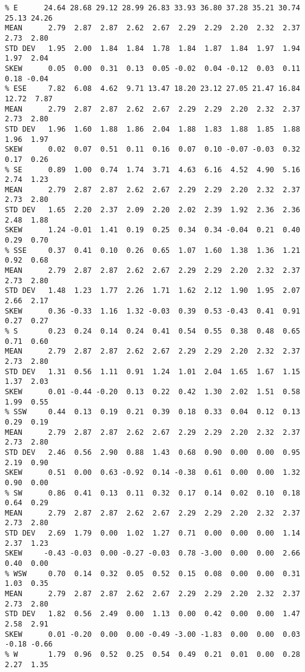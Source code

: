 \begin{verbatim}
% E      24.64 28.68 29.12 28.99 26.83 33.93 36.80 37.28 35.21 30.74 25.13 24.26
MEAN      2.79  2.87  2.87  2.62  2.67  2.29  2.29  2.20  2.32  2.37  2.73  2.80
STD DEV   1.95  2.00  1.84  1.84  1.78  1.84  1.87  1.84  1.97  1.94  1.97  2.04
SKEW      0.05  0.00  0.31  0.13  0.05 -0.02  0.04 -0.12  0.03  0.11  0.18 -0.04
% ESE     7.82  6.08  4.62  9.71 13.47 18.20 23.12 27.05 21.47 16.84 12.72  7.87
MEAN      2.79  2.87  2.87  2.62  2.67  2.29  2.29  2.20  2.32  2.37  2.73  2.80
STD DEV   1.96  1.60  1.88  1.86  2.04  1.88  1.83  1.88  1.85  1.88  1.96  1.97
SKEW      0.02  0.07  0.51  0.11  0.16  0.07  0.10 -0.07 -0.03  0.32  0.17  0.26
% SE      0.89  1.00  0.74  1.74  3.71  4.63  6.16  4.52  4.90  5.16  2.74  1.23
MEAN      2.79  2.87  2.87  2.62  2.67  2.29  2.29  2.20  2.32  2.37  2.73  2.80
STD DEV   1.65  2.20  2.37  2.09  2.20  2.02  2.39  1.92  2.36  2.36  2.48  1.88
SKEW      1.24 -0.01  1.41  0.19  0.25  0.34  0.34 -0.04  0.21  0.40  0.29  0.70
% SSE     0.37  0.41  0.10  0.26  0.65  1.07  1.60  1.38  1.36  1.21  0.92  0.68
MEAN      2.79  2.87  2.87  2.62  2.67  2.29  2.29  2.20  2.32  2.37  2.73  2.80
STD DEV   1.48  1.23  1.77  2.26  1.71  1.62  2.12  1.90  1.95  2.07  2.66  2.17
SKEW      0.36 -0.33  1.16  1.32 -0.03  0.39  0.53 -0.43  0.41  0.91  0.27  0.27
% S       0.23  0.24  0.14  0.24  0.41  0.54  0.55  0.38  0.48  0.65  0.71  0.60
MEAN      2.79  2.87  2.87  2.62  2.67  2.29  2.29  2.20  2.32  2.37  2.73  2.80
STD DEV   1.31  0.56  1.11  0.91  1.24  1.01  2.04  1.65  1.67  1.15  1.37  2.03
SKEW      0.01 -0.44 -0.20  0.13  0.22  0.42  1.30  2.02  1.51  0.58  1.99  0.55
% SSW     0.44  0.13  0.19  0.21  0.39  0.18  0.33  0.04  0.12  0.13  0.29  0.19
MEAN      2.79  2.87  2.87  2.62  2.67  2.29  2.29  2.20  2.32  2.37  2.73  2.80
STD DEV   2.46  0.56  2.90  0.88  1.43  0.68  0.90  0.00  0.00  0.95  2.19  0.90
SKEW      0.51  0.00  0.63 -0.92  0.14 -0.38  0.61  0.00  0.00  1.32  0.90  0.00
% SW      0.86  0.41  0.13  0.11  0.32  0.17  0.14  0.02  0.10  0.18  0.64  0.29
MEAN      2.79  2.87  2.87  2.62  2.67  2.29  2.29  2.20  2.32  2.37  2.73  2.80
STD DEV   2.69  1.79  0.00  1.02  1.27  0.71  0.00  0.00  0.00  1.14  2.37  1.23
SKEW     -0.43 -0.03  0.00 -0.27 -0.03  0.78 -3.00  0.00  0.00  2.66  0.40  0.00
% WSW     0.70  0.14  0.32  0.05  0.52  0.15  0.08  0.00  0.00  0.31  1.03  0.35
MEAN      2.79  2.87  2.87  2.62  2.67  2.29  2.29  2.20  2.32  2.37  2.73  2.80
STD DEV   1.82  0.56  2.49  0.00  1.13  0.00  0.42  0.00  0.00  1.47  2.58  2.91
SKEW      0.01 -0.20  0.00  0.00 -0.49 -3.00 -1.83  0.00  0.00  0.03 -0.18 -0.66
% W       1.79  0.96  0.52  0.25  0.54  0.49  0.21  0.01  0.00  0.28  2.27  1.35

\end{verbatim}
